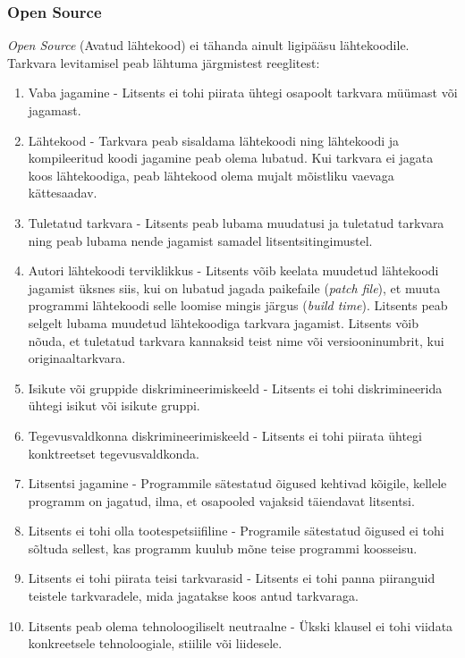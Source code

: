 \documentclass[a4paper,12pt]{article} %
\begin{document}
\subsubsection{Open Source}
\textit{Open Source} (Avatud lähtekood) ei tähanda ainult ligipääsu lähtekoodile. Tarkvara levitamisel peab lähtuma järgmistest reeglitest:
\begin{enumerate}
\item Vaba jagamine - Litsents ei tohi piirata ühtegi osapoolt tarkvara müümast või jagamast.
\item Lähtekood -  Tarkvara peab sisaldama lähtekoodi ning lähtekoodi ja kompileeritud koodi jagamine peab olema lubatud. Kui tarkvara ei jagata koos lähtekoodiga, peab lähtekood olema mujalt mõistliku vaevaga kättesaadav.
\item Tuletatud tarkvara - Litsents peab lubama muudatusi ja tuletatud tarkvara ning peab lubama nende jagamist samadel litsentsitingimustel.
\item Autori lähtekoodi terviklikkus - Litsents võib keelata muudetud lähtekoodi jagamist üksnes siis, kui on lubatud jagada paikefaile (\textit{patch file}), et muuta programmi lähtekoodi selle loomise mingis järgus (\textit{build time}). Litsents peab selgelt lubama muudetud lähtekoodiga tarkvara jagamist. Litsents võib nõuda, et tuletatud tarkvara kannaksid teist nime või versiooninumbrit, kui originaaltarkvara.
\item Isikute või gruppide diskrimineerimiskeeld - Litsents ei tohi diskrimineerida ühtegi isikut või isikute gruppi.
\item Tegevusvaldkonna diskrimineerimiskeeld - Litsents ei tohi piirata ühtegi konktreetset tegevusvaldkonda.
\item Litsentsi jagamine - Programmile sätestatud õigused kehtivad kõigile, kellele programm on jagatud, ilma, et osapooled vajaksid täiendavat litsentsi.
\item Litsents ei tohi olla tootespetsiifiline - Programile sätestatud õigused ei tohi sõltuda sellest, kas programm kuulub mõne teise programmi koosseisu.
\item Litsents ei tohi piirata teisi tarkvarasid - Litsents ei tohi panna piiranguid teistele tarkvaradele, mida jagatakse koos antud tarkvaraga.
\item Litsents peab olema tehnoloogiliselt neutraalne - Ükski klausel ei tohi viidata konkreetsele tehnoloogiale, stiilile või liidesele.
\end{enumerate}
\cite{Open_Source_Def}
\end{document}

